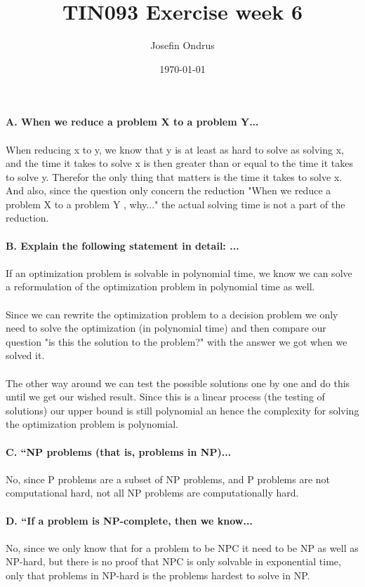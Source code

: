\documentclass[12pt,oneside,reqno]{amsart}
\begin{document}
\setlength{\parindent}{6pt}
\def\code#1{\texttt{#1}} %

\title{TIN093 Exercise week 6}
\author{Josefin Ondrus}
\date{\today}
\maketitle

\textbf{A. When we reduce a problem X to a problem Y...}\\\\
When reducing x to y, we know that y is at least as hard to solve as solving x, and the time it takes to solve x is then greater than or equal to the time it takes to solve y. Therefor the only thing that matters is the time it takes to solve x. And also, since the question only concern the reduction "When we reduce a problem X to a problem Y , why..." the actual solving time is not a part of the reduction.\\\\

\textbf{B. Explain the following statement in detail: ...}\\\\
If an optimization problem is solvable in polynomial time, we know we can solve a reformulation of the optimization problem in polynomial time as well.\\\\
Since we can rewrite the optimization problem to a decision problem we only need to solve the optimization (in polynomial time) and then compare our question "is this the solution to the problem?" with the answer we got when we solved it.\\\\
The other way around we can test the possible solutions one by one and do this until we get our wished result. Since this is a linear process (the testing of solutions) our upper bound is still polynomial an hence the complexity for solving the optimization problem is polynomial.\\\\

\textbf{C. “NP problems (that is, problems in NP)...}\\\\
No, since P problems are a subset of NP problems, and P problems are not computational hard, not all NP problems are computationally hard.\\\\
\newpage
\textbf{D. “If a problem is NP-complete, then we know...}\\\\
No, since we only know that for a problem to be NPC it need to be NP as well as NP-hard, but there is no proof that NPC is only solvable in exponential time, only that problems in NP-hard is the problems hardest to solve in NP.\\\\
\end{document}
